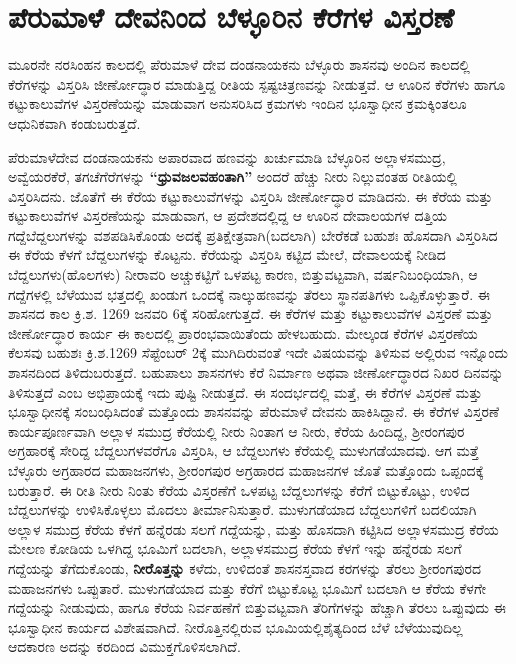 \section*{ಪೆರುಮಾಳೆ ದೇವನಿಂದ ಬೆಳ್ಳೂರಿನ ಕೆರೆಗಳ ವಿಸ್ತರಣೆ}

ಮೂರನೇ ನರಸಿಂಹನ ಕಾಲದಲ್ಲಿ ಪೆರುಮಾಳೆ ದೇವ ದಂಡನಾಯಕನು ಬೆಳ್ಳೂರು ಶಾಸನವು ಅಂದಿನ ಕಾಲದಲ್ಲಿ ಕೆರೆಗಳನ್ನು ವಿಸ್ತರಿಸಿ ಜೀರ್ಣೋದ್ಧಾರ ಮಾಡುತ್ತಿದ್ದ ರೀತಿಯ ಸ್ಪಷ್ಟಚಿತ್ರಣವನ್ನು ನೀಡುತ್ತವೆ. ಆ ಊರಿನ ಕೆರೆಗಳು ಹಾಗೂ ಕಟ್ಟುಕಾಲುವೆಗಳ ವಿಸ್ತರಣೆಯನ್ನು ಮಾಡುವಾಗ ಅನುಸರಿಸಿದ ಕ್ರಮಗಳು ಇಂದಿನ ಭೂಸ್ವಾಧೀನ ಕ್ರಮಕ್ಕಿಂತಲೂ ಆಧುನಿಕವಾಗಿ ಕಂಡುಬರುತ್ತದೆ.

ಪೆರುಮಾಳೆದೇವ ದಂಡನಾಯಕನು ಅಪಾರವಾದ ಹಣವನ್ನು ಖರ್ಚುಮಾಡಿ ಬೆಳ್ಳೂರಿನ ಅಲ್ಲಾಳಸಮುದ್ರ, ಅವ್ವೆಯರಕೆರೆ, ತಗಚೆಗೆರೆಗಳನ್ನು \textbf{“ಧ್ರುವಜಲವಹಂತಾಗಿ”} ಅಂದರೆ ಹೆಚ್ಚು ನೀರು ನಿಲ್ಲುವಂತಹ ರೀತಿಯಲ್ಲಿ ವಿಸ್ತರಿಸಿದನು. ಜೊತೆಗೆ ಈ ಕೆರೆಯ ಕಟ್ಟುಕಾಲುವೆಗಳನ್ನು ವಿಸ್ತರಿಸಿ ಜೀರ್ಣೋದ್ಧಾರ ಮಾಡಿದನು. ಈ ಕೆರೆಯ ಮತ್ತು ಕಟ್ಟುಕಾಲುವೆಗಳ ವಿಸ್ತರಣೆಯನ್ನು ಮಾಡುವಾಗ, ಆ ಪ್ರದೇಶದಲ್ಲಿದ್ದ ಆ ಊರಿನ ದೇವಾಲಯಗಳ ದತ್ತಿಯ ಗದ್ದೆಬೆದ್ದಲುಗಳನ್ನು ವಶಪಡಿಸಿಕೊಂಡು ಅದಕ್ಕೆ ಪ್ರತಿಕ್ಷೇತ್ರವಾಗಿ(ಬದಲಾಗಿ) ಬೇರೆಕಡೆ ಬಹುಶಃ ಹೊಸದಾಗಿ ವಿಸ್ತರಿಸಿದ ಈ ಕೆರೆಯ ಕೆಳಗೆ ಬೆದ್ದಲುಗಳನ್ನು ಕೊಟ್ಟನು. ಕೆರೆಯನ್ನು ವಿಸ್ತರಿಸಿ ಕಟ್ಟಿದ ಮೇಲೆ, ದೇವಾಲಯಕ್ಕೆ ನೀಡಿದ ಬೆದ್ದಲುಗಳು(ಹೊಲಗಳು) ನೀರಾವರಿ ಅಚ್ಚುಕಟ್ಟಿಗೆ ಒಳಪಟ್ಟ ಕಾರಣ, ಬಿತ್ತುವಟ್ಟವಾಗಿ, ವರ್ಷನಿಬಂಧಿಯಾಗಿ, ಆ ಗದ್ದೆಗಳಲ್ಲಿ ಬೆಳೆಯುವ ಭತ್ತದಲ್ಲಿ ಖಂಡುಗ ಒಂದಕ್ಕೆ ನಾಲ್ಕುಹಣವನ್ನು ತೆರಲು ಸ್ಥಾನಪತಿಗಳು ಒಪ್ಪಿಕೊಳ್ಳುತ್ತಾರೆ. ಈ ಶಾಸನದ ಕಾಲ ಕ್ರಿ.ಶ. 1269 ಜನವರಿ 6ಕ್ಕೆ ಸರಿಹೋಗುತ್ತದೆ. ಈ ಕೆರೆಗಳ ಮತ್ತು ಕಟ್ಟುಕಾಲುವೆಗಳ ವಿಸ್ತರಣೆ ಮತ್ತು ಜೀರ್ಣೋದ್ಧಾರ ಕಾರ್ಯ ಈ ಕಾಲದಲ್ಲಿ ಪ್ರಾರಂಭವಾಯಿತೆಂದು ಹೇಳಬಹುದು. ಮೇಲ್ಕಂಡ ಕೆರೆಗಳ ವಿಸ್ತರಣೆಯ ಕೆಲಸವು ಬಹುಶಃ ಕ್ರಿ.ಶ.1269 ಸೆಪ್ಟೆಂಬರ್​ 2ಕ್ಕೆ ಮುಗಿದಿರುವಂತೆ ಇದೇ ವಿಷಯವನ್ನು ತಿಳಿಸುವ ಅಲ್ಲಿರುವ ಇನ್ನೊಂದು ಶಾಸನದಿಂದ ತಿಳಿದುಬರುತ್ತದೆ. ಬಹುಪಾಲು ಶಾಸನಗಳು ಕೆರೆ ನಿರ್ಮಾಣ ಅಥವಾ ಜೀರ್ಣೋದ್ಧಾರದ ನಿಖರ ದಿನವನ್ನು ತಿಳಿಸುತ್ತದೆ ಎಂಬ ಅಭಿಪ್ರಾಯಕ್ಕೆ ಇದು ಪುಷ್ಟಿ ನೀಡುತ್ತದೆ. ಈ ಸಂದರ್ಭದಲ್ಲಿ ಮತ್ತೆ, ಈ ಕೆರೆಗಳ ವಿಸ್ತರಣೆ ಮತ್ತು ಭೂಸ್ವಾಧೀನಕ್ಕೆ ಸಂಬಂಧಿಸಿದಂತೆ ಮತ್ತೊಂದು ಶಾಸನವನ್ನು ಪೆರುಮಾಳೆ ದೇವನು ಹಾಕಿಸಿದ್ದಾನೆ. ಈ ಕೆರೆಗಳ ವಿಸ್ತರಣೆ ಕಾರ್ಯಪೂರ್ಣವಾಗಿ ಅಲ್ಲಾಳ ಸಮುದ್ರ ಕೆರೆಯಲ್ಲಿ ನೀರು ನಿಂತಾಗ ಆ ನೀರು, ಕೆರೆಯ ಹಿಂದಿದ್ದ, ಶ‍್ರೀರಂಗಪುರ ಅಗ್ರಹಾರಕ್ಕೆ ಸೇರಿದ್ದ ಬೆದ್ದಲುಗಳವರೆಗೂ ವಿಸ್ತರಿಸಿ, ಆ ಬೆದ್ದಲುಗಳು ಕೆರೆಯಲ್ಲಿ ಮುಳುಗಡೆಯಾದವು. ಆಗ ಮತ್ತೆ ಬೆಳ್ಳೂರು ಅಗ್ರಹಾರದ ಮಹಾಜನಗಳು, ಶ‍್ರೀರಂಗಪುರ ಅಗ್ರಹಾರದ ಮಹಾಜನಗಳ ಜೊತೆ ಮತ್ತೊಂದು ಒಪ್ಪಂದಕ್ಕೆ ಬರುತ್ತಾರೆ. ಈ ರೀತಿ ನೀರು ನಿಂತು ಕೆರೆಯ ವಿಸ್ತರಣೆಗೆ ಒಳಪಟ್ಟ ಬೆದ್ದಲುಗಳನ್ನು ಕೆರೆಗೆ ಬಿಟ್ಟುಕೊಟ್ಟು, ಉಳಿದ ಬೆದ್ದಲುಗಳನ್ನು ಉಳಿಸಿಕೊಳ್ಳಲು ಮೊದಲು ತೀರ್ಮಾನಿಸುತ್ತಾರೆ. ಮುಳುಗಡೆಯಾದ ಬೆದ್ದಲುಗಳಿಗೆ ಬದಲಿಯಾಗಿ ಅಲ್ಲಾಳ ಸಮುದ್ರ ಕೆರೆಯ ಕೆಳಗೆ ಹನ್ನೆರಡು ಸಲಗೆ ಗದ್ದೆಯನ್ನು, ಮತ್ತು ಹೊಸದಾಗಿ ಕಟ್ಟಿಸಿದ ಅಲ್ಲಾಳಸಮುದ್ರ ಕೆರೆಯ ಮೇಲಣ ಕೋಡಿಯ ಒಳಗಿದ್ದ ಭೂಮಿಗೆ ಬದಲಾಗಿ, ಅಲ್ಲಾಳಸಮುದ್ರ ಕೆರೆಯ ಕೆಳಗೆ ಇನ್ನು ಹನ್ನೆರಡು ಸಲಗೆ ಗದ್ದೆಯನ್ನು ತೆಗೆದುಕೊಂಡು, \textbf{ನೀರೊತ್ತನ್ನು} ಕಳೆದು, ಉಳಿದಂತೆ ಶಾಸನಸ್ತವಾದ ಕರಗಳನ್ನು ತೆರಲು ಶ‍್ರೀರಂಗಪುರದ ಮಹಾಜನಗಳು ಒಪ್ಪುತಾರೆ. ಮುಳುಗಡೆಯಾದ ಮತ್ತು ಕೆರೆಗೆ ಬಿಟ್ಟುಕೊಟ್ಟ ಭೂಮಿಗೆ ಬದಲಾಗಿ ಆ ಕೆರೆಯ ಕೆಳಗೇ ಗದ್ದೆಯನ್ನು ನೀಡುವುದು, ಹಾಗೂ ಕೆರೆಯ ನಿರ್ವಹಣೆಗೆ ಬಿತ್ತುವಟ್ಟವಾಗಿ ತೆರಿಗೆಗಳನ್ನು ಹೆಚ್ಚಾಗಿ ತೆರಲು ಒಪ್ಪುವುದು ಈ ಭೂಸ್ವಾಧೀನ ಕಾರ್ಯದ ವಿಶೇಷವಾಗಿದೆ. ನೀರೊತ್ತಿನಲ್ಲಿರುವ ಭೂಮಿಯಲ್ಲಿ\break ಶೈತ್ಯದಿಂದ ಬೆಳೆ ಬೆಳೆಯುವುದಿಲ್ಲ ಆದಕಾರಣ ಅದನ್ನು ಕರದಿಂದ ವಿಮುಕ್ತಗೊಳಿಸಲಾಗಿದೆ.

